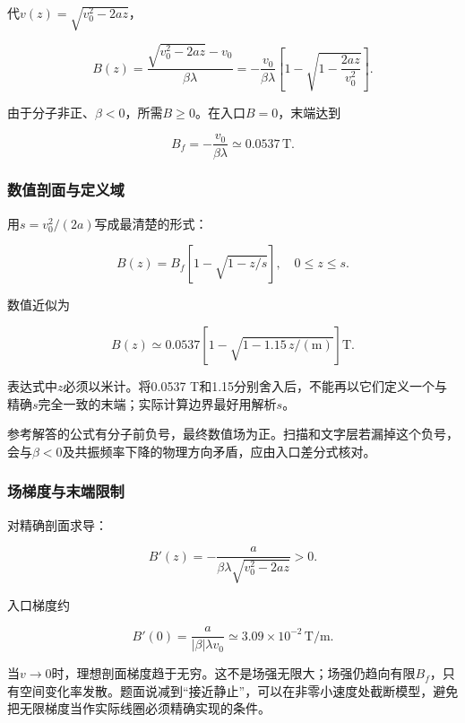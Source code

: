 \documentclass[12pt,a4paper,fontset=fandol]{ctexart}
\begin{document}
代\(v(z)=\sqrt{v_0^2-2az}\)，

\[
\boxed{
B(z)=\frac{\sqrt{v_0^2-2az}-v_0}{\beta\lambda}
=-\frac{v_0}{\beta\lambda}
\left[1-\sqrt{1-\frac{2az}{v_0^2}}\right]}.
\]

由于分子非正、\(\beta<0\)，所需\(B\geq0\)。在入口\(B=0\)，末端达到

\[
\boxed{B_f=-\frac{v_0}{\beta\lambda}
\simeq0.0537\,\mathrm T}.
\]

\subsubsection{数值剖面与定义域}\label{ux6570ux503cux5256ux9762ux4e0eux5b9aux4e49ux57df}

用\(s=v_0^2/(2a)\)写成最清楚的形式：

\[
\boxed{
B(z)=B_f\left[1-\sqrt{1-z/s}\right],
\quad0\leq z\leq s}.
\]

数值近似为

\[
B(z)\simeq0.0537
\left[1-\sqrt{1-1.15\,z/(\mathrm m)}\right]\mathrm T.
\]

表达式中\(z\)必须以米计。将0.0537
T和1.15分别舍入后，不能再以它们定义一个与精确\(s\)完全一致的末端；实际计算边界最好用解析\(s\)。

参考解答的公式有分子前负号，最终数值场为正。扫描和文字层若漏掉这个负号，会与\(\beta<0\)及共振频率下降的物理方向矛盾，应由入口差分式核对。

\subsubsection{场梯度与末端限制}\label{ux573aux68afux5ea6ux4e0eux672bux7aefux9650ux5236}

对精确剖面求导：

\[
B'(z)=-\frac{a}{\beta\lambda\sqrt{v_0^2-2az}}>0.
\]

入口梯度约

\[
B'(0)=\frac{a}{|\beta|\lambda v_0}
\simeq3.09\times10^{-2}\,\mathrm{T/m}.
\]

当\(v\to0\)时，理想剖面梯度趋于无穷。这不是场强无限大；场强仍趋向有限\(B_f\)，只有空间变化率发散。题面说减到``接近静止''，可以在非零小速度处截断模型，避免把无限梯度当作实际线圈必须精确实现的条件。
\end{document}
